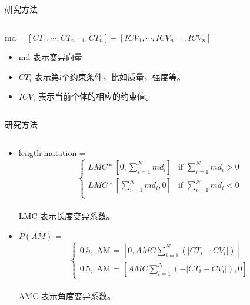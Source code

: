 \documentclass{beamer}
\begin{document}
\begin{frame}{研究方法}
    \begin{columns}[c]
    \begin{column}{1\textwidth}
		$\text{md} = [CT_1, \cdots, CT_{n-1}, CT_n] -  [ICV_1, \cdots, ICV_{n-1},
		ICV_n]$ \\
		\begin{itemize}
			\item  md 表示变异向量 
			\item  $CT_i$ 表示第i个约束条件，比如质量，强度等。
			\item  $ICV_i$ 表示当前个体的相应的约束值。
		\end{itemize}

    \end{column}
\end{columns}
\end{frame}



\begin{frame}{研究方法}
    \begin{columns}[c]
	\begin{column}{1\textwidth}
		\begin{itemize}
			\item length mutation =  
				\[
				  \begin{cases}
					  LMC*[0, \sum_{i=1}^{N}{md_i}] & \text{if $\sum_{i=1}^{N}{md_i} > 0$} \\
					  LMC*[\sum_{i=1}^{N}{md_i}, 0] & \text{if $\sum_{i=1}^{N}{md_i} < 0$} \\
				  \end{cases}
				\] \\
				LMC 表示长度变异系数。
			\item $P(AM)$ = 
				\[
				  \begin{cases}
					0.5, \text{ AM = }[0,AMC \sum_{i=1}^{N}{(|CT_i-CV_i|)}] \\ 
					0.5, \text{ AM = }[ AMC \sum_{i=1}^{N}{(-|CT_i-CV_i|)},0]
				  \end{cases}
				\] \\
				AMC 表示角度变异系数。 
		\end{itemize}
	\end{column}
\end{columns}
\end{frame}
\end{document}
